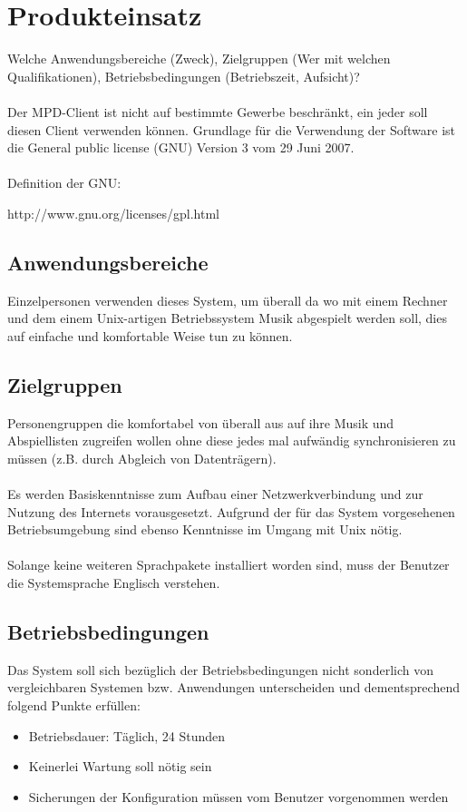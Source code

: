 \chapter{Produkteinsatz}
Welche Anwendungsbereiche (Zweck), Zielgruppen (Wer mit welchen Qualifikationen), Betriebsbedingungen (Betriebszeit,
Aufsicht)?\ \\ \\
Der MPD-Client ist nicht auf bestimmte Gewerbe beschränkt, ein jeder soll diesen Client
verwenden können. Grundlage für die Verwendung der Software ist die General public license (GNU)
Version 3 vom 29 Juni 2007.\ \\ \\
Definition der GNU:
\begin{center}
http://www.gnu.org/licenses/gpl.html
\end{center}
\section{Anwendungsbereiche}
Einzelpersonen verwenden dieses System, um überall da wo mit einem Rechner und dem
einem Unix-artigen Betriebssystem Musik abgespielt werden soll, dies auf einfache und
komfortable Weise tun zu können.
\section{Zielgruppen}
Personengruppen die komfortabel von überall aus auf ihre Musik und Abspiellisten zugreifen
wollen ohne diese jedes mal aufwändig synchronisieren zu müssen (z.B. durch Abgleich von Datenträgern).\ \\ \\
Es werden Basiskenntnisse zum Aufbau einer Netzwerkverbindung und zur Nutzung des Internets vorausgesetzt.
Aufgrund der für das System vorgesehenen Betriebsumgebung sind ebenso Kenntnisse im Umgang mit Unix nötig.\ \\ \\
Solange keine weiteren Sprachpakete installiert worden sind, muss der Benutzer die Systemsprache Englisch verstehen.
\section{Betriebsbedingungen}
Das System soll sich bezüglich der Betriebsbedingungen nicht sonderlich von vergleichbaren Systemen bzw.
Anwendungen unterscheiden und dementsprechend folgend Punkte erfüllen:
\begin{itemize}
		\item Betriebsdauer: Täglich, 24 Stunden
		\item Keinerlei Wartung soll nötig sein
		\item Sicherungen der Konfiguration müssen vom Benutzer vorgenommen werden
\end{itemize}
